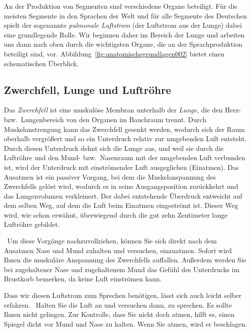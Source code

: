 An der Produktion von Segmenten sind verschiedene Organe beteiligt.
Für die meisten Segmente in den Sprachen der Welt und für alle Segmente des Deutschen spielt der sogenannte \textit{pulmonale Luftstrom} (der Luftstrom aus der Lunge) dabei eine grundlegende Rolle.
Wir beginnen daher im Bereich der Lunge und arbeiten uns dann nach oben durch die wichtigsten Organe, die an der Sprachproduktion beteiligt sind, vor.
Abbildung~\ref{fig:anatomischegrundlagen002} bietet einen schematischen Überblick.

\subsection{Zwerchfell, Lunge und Luftröhre}
\label{sec:zwerchfelllungeundluftroehre}

Das \textit{Zwerchfell} ist eine muskulöse Membran unterhalb der \textit{Lunge}, die den Herz- bzw.\ Lungenbereich von den Organen im Bauchraum trennt.
Durch Muskelanstrengung kann das Zwerchfell gesenkt werden, wodurch sich der Raum oberhalb vergrößert und so ein Unterdruck relativ zur umgebenden Luft entsteht.
Durch diesen Unterdruck dehnt sich die Lunge aus, und weil sie durch die Luftröhre und den Mund- bzw.\ Nasenraum mit der umgebenden Luft verbunden ist, wird der Unterdruck mit einströmender Luft ausgeglichen (Einatmen).
Das Ausatmen ist ein passiver Vorgang, bei dem die Muskelanspannung des Zwerchfells gelöst wird, wodurch es in seine Ausgangsposition zurückkehrt und das Lungenvolumen verkleinert.
Der dabei entstehende Überdruck entweicht auf dem selben Weg, auf dem die Luft beim Einatmen eingeströmt ist.
Dieser Weg wird, wie schon erwähnt, überwiegend durch die gut zehn Zentimeter lange Luftröhre gebildet.

\TuBegin~Um diese Vorgänge nachzuvollziehen, können Sie sich direkt nach dem Ausatmen Nase und Mund zuhalten und versuchen, einzuatmen.
Sofort wird Ihnen die muskuläre Anspannung des Zwerchfells auffallen.
Außerdem werden Sie bei zugehaltener Nase und zugehaltenem Mund das Gefühl des Unterdrucks im Brustkorb bemerken, da keine Luft einströmen kann.

Dass wir diesen Luftstrom zum Sprechen benötigen, lässt sich auch leicht selber erfahren.
\TuBegin~Halten Sie die Luft an und versuchen dann, zu sprechen.
Es sollte Ihnen nicht gelingen.
Zur Kontrolle, dass Sie nicht doch atmen, hilft es, einen Spiegel dicht vor Mund und Nase zu halten.
Wenn Sie atmen, wird er beschlagen.


